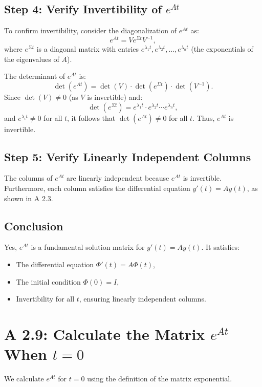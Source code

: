 \documentclass[12pt]{article}
\begin{document}
\subsection*{Step 4: Verify Invertibility of \(e^{At}\)}

To confirm invertibility, consider the diagonalization of \(e^{At}\) as:
\[
e^{At} = V e^{\Sigma t} V^{-1},
\]
where \(e^{\Sigma t}\) is a diagonal matrix with entries \(e^{\lambda_1 t}, e^{\lambda_2 t}, \ldots, e^{\lambda_n t}\) (the exponentials of the eigenvalues of \(A\)).

The determinant of \(e^{At}\) is:
\[
\det(e^{At}) = \det(V) \cdot \det(e^{\Sigma t}) \cdot \det(V^{-1}).
\]
Since \(\det(V) \neq 0\) (as \(V\) is invertible) and:
\[
\det(e^{\Sigma t}) = e^{\lambda_1 t} \cdot e^{\lambda_2 t} \cdots e^{\lambda_n t},
\]
and \(e^{\lambda_i t} \neq 0\) for all \(t\), it follows that \(\det(e^{At}) \neq 0\) for all \(t\). Thus, \(e^{At}\) is invertible.

\subsection*{Step 5: Verify Linearly Independent Columns}

The columns of \(e^{At}\) are linearly independent because \(e^{At}\) is invertible. Furthermore, each column satisfies the differential equation \(y'(t) = Ay(t)\), as shown in A 2.3.

\subsection*{Conclusion}

Yes, \(e^{At}\) is a fundamental solution matrix for \(y'(t) = Ay(t)\). It satisfies:
\begin{itemize}
    \item The differential equation \(\Phi'(t) = A \Phi(t)\),
    \item The initial condition \(\Phi(0) = I\),
    \item Invertibility for all \(t\), ensuring linearly independent columns.
\end{itemize}

\section*{A 2.9: Calculate the Matrix \(e^{At}\) When \(t = 0\)}

We calculate \(e^{At}\) for \(t = 0\) using the definition of the matrix exponential.
\end{document}
